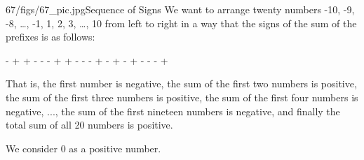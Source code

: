 \begin{problem}{67/figs/67_pic.jpg}{Sequence of Signs} We want to arrange twenty numbers -10, -9, -8, \ldots, -1, 1, 2, 3, \ldots, 10 from left to right in a way that the signs of the sum of the prefixes is as follows:
	
\textsf{- + + - - - + + - - - + - + - + - - - +}
	
That is, the first number is negative, the sum of the first two numbers is positive, the sum of the first three numbers is positive, the sum of the first four numbers is negative, ..., the sum of the first nineteen numbers is negative, and finally the total sum of all 20 numbers is positive.

We consider 0 as a positive number.
\end{problem}
